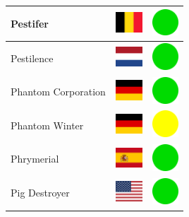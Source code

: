 \documentclass[12pt, a4paper, twoside]{report}
\begin{document}
\begin{center}
\begin{longtable}{|p{5cm}|p{2cm}|p{2cm}|}
 Pestifer                                                   & \includegraphics[width=1cm]{../img/flags/be} &   \includegraphics[width=1cm]{../likes/y} \\ \hline
 Pestilence                                                 & \includegraphics[width=1cm]{../img/flags/nl} &   \includegraphics[width=1cm]{../likes/y} \\ \hline
 Phantom Corporation                                        & \includegraphics[width=1cm]{../img/flags/de} &   \includegraphics[width=1cm]{../likes/y} \\ \hline
 Phantom Winter                                             & \includegraphics[width=1cm]{../img/flags/de} &   \includegraphics[width=1cm]{../likes/m} \\ \hline
 Phrymerial                                                 & \includegraphics[width=1cm]{../img/flags/es} &   \includegraphics[width=1cm]{../likes/y} \\ \hline
 Pig Destroyer                                              & \includegraphics[width=1cm]{../img/flags/us} &   \includegraphics[width=1cm]{../likes/y} \\ \hline

\end{longtable}
\end{center}
\end{document}
